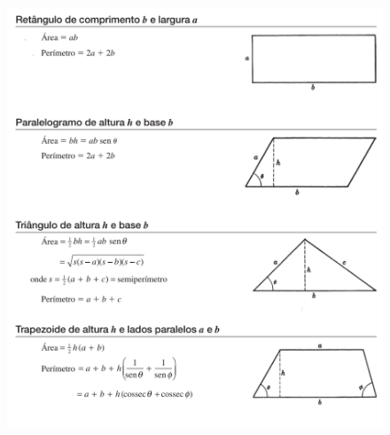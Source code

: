 \begin{figure}[H]
    \centering
    \includegraphics[width=\textwidth]{matematica/geometria/formulas1}
\end{figure}

